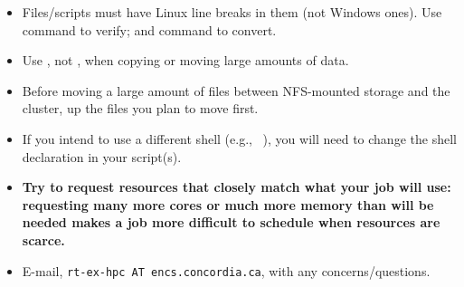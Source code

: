 

\begin{itemize}
\item
Files/scripts must have Linux line breaks in them (not Windows ones).
Use  command to verify; and  command
to convert.

\item
Use , not , when copying or moving large amounts of data.

\item
Before moving a large amount of files between NFS-mounted storage and the 
cluster,  up the files you plan to move first. 

\item
If you intend to use a different shell (e.g., ~\cite{aosa-book-vol1-bash}),
you will need to change the shell declaration in your script(s).


\item
\textbf{Try to request resources that closely match what your job will use: 
requesting many more cores or much more memory than will be needed makes a 
job more difficult to schedule when resources are scarce.}

\item
E-mail, \texttt{rt-ex-hpc AT encs.concordia.ca}, with any concerns/questions.
\end{itemize}